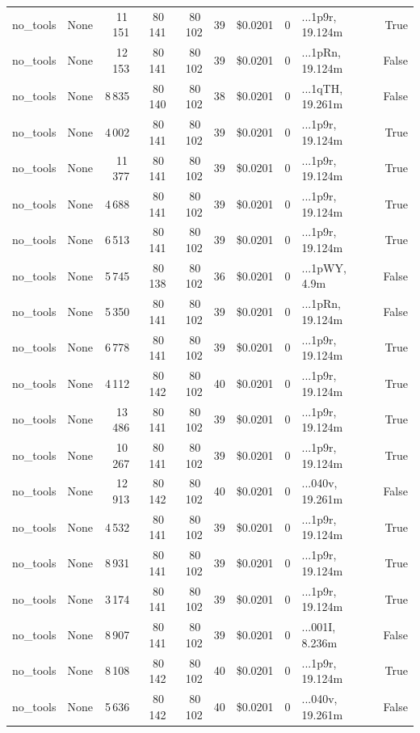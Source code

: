 \documentclass[a4paper,11pt]{article}
\begin{document}
\begin{table}[H]
{\begin{tabular}{l r r r r r r r l r}
no\_tools & None & 11\,151 & 80\,141 & 80\,102 & 39 & \$0.0201 & 0 & ...1p9r, 19.124m & True \\
no\_tools & None & 12\,153 & 80\,141 & 80\,102 & 39 & \$0.0201 & 0 & ...1pRn, 19.124m & False \\
no\_tools & None & 8\,835 & 80\,140 & 80\,102 & 38 & \$0.0201 & 0 & ...1qTH, 19.261m & False \\
no\_tools & None & 4\,002 & 80\,141 & 80\,102 & 39 & \$0.0201 & 0 & ...1p9r, 19.124m & True \\
no\_tools & None & 11\,377 & 80\,141 & 80\,102 & 39 & \$0.0201 & 0 & ...1p9r, 19.124m & True \\
no\_tools & None & 4\,688 & 80\,141 & 80\,102 & 39 & \$0.0201 & 0 & ...1p9r, 19.124m & True \\
no\_tools & None & 6\,513 & 80\,141 & 80\,102 & 39 & \$0.0201 & 0 & ...1p9r, 19.124m & True \\
no\_tools & None & 5\,745 & 80\,138 & 80\,102 & 36 & \$0.0201 & 0 & ...1pWY, 4.9m & False \\
no\_tools & None & 5\,350 & 80\,141 & 80\,102 & 39 & \$0.0201 & 0 & ...1pRn, 19.124m & False \\
no\_tools & None & 6\,778 & 80\,141 & 80\,102 & 39 & \$0.0201 & 0 & ...1p9r, 19.124m & True \\
no\_tools & None & 4\,112 & 80\,142 & 80\,102 & 40 & \$0.0201 & 0 & ...1p9r, 19.124m & True \\
no\_tools & None & 13\,486 & 80\,141 & 80\,102 & 39 & \$0.0201 & 0 & ...1p9r, 19.124m & True \\
no\_tools & None & 10\,267 & 80\,141 & 80\,102 & 39 & \$0.0201 & 0 & ...1p9r, 19.124m & True \\
no\_tools & None & 12\,913 & 80\,142 & 80\,102 & 40 & \$0.0201 & 0 & ...040v, 19.261m & False \\
no\_tools & None & 4\,532 & 80\,141 & 80\,102 & 39 & \$0.0201 & 0 & ...1p9r, 19.124m & True \\
no\_tools & None & 8\,931 & 80\,141 & 80\,102 & 39 & \$0.0201 & 0 & ...1p9r, 19.124m & True \\
no\_tools & None & 3\,174 & 80\,141 & 80\,102 & 39 & \$0.0201 & 0 & ...1p9r, 19.124m & True \\
no\_tools & None & 8\,907 & 80\,141 & 80\,102 & 39 & \$0.0201 & 0 & ...001I, 8.236m & False \\
no\_tools & None & 8\,108 & 80\,142 & 80\,102 & 40 & \$0.0201 & 0 & ...1p9r, 19.124m & True \\
no\_tools & None & 5\,636 & 80\,142 & 80\,102 & 40 & \$0.0201 & 0 & ...040v, 19.261m & False \\

\end{tabular}}
\end{table}
\end{document}
